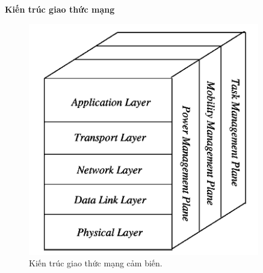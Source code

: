 \documentclass{report}
\begin{document}
\noindent
\textbf{Kiến trúc giao thức mạng} \\
\begin{figure}[h]
	\centering
	\includegraphics[scale = 0.7]{fig4.png}
	\caption{Kiến trúc giao thức mạng cảm biến.}
	\label{fig:Graph4}
\end{figure}
\end{document}
